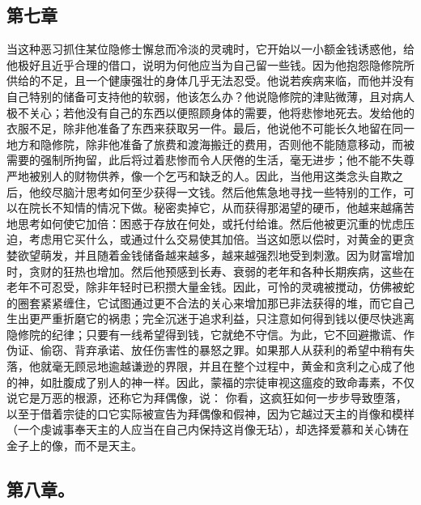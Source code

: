 \subsection{第七章}

\par

当这种恶习抓住某位隐修士懈怠而冷淡的灵魂时，它开始以一小额金钱诱惑他，给他极好且近乎合理的借口，说明为何他应当为自己留一些钱。因为他抱怨隐修院所供给的不足，且一个健康强壮的身体几乎无法忍受。他说若疾病来临，而他并没有自己特别的储备可支持他的软弱，他该怎么办？他说隐修院的津贴微薄，且对病人极不关心；若他没有自己的东西以便照顾身体的需要，他将悲惨地死去。发给他的衣服不足，除非他准备了东西来获取另一件。最后，他说他不可能长久地留在同一地方和隐修院，除非他准备了旅费和渡海搬迁的费用，否则他不能随意移动，而被需要的强制所拘留，此后将过着悲惨而令人厌倦的生活，毫无进步；他不能不失尊严地被别人的财物供养，像一个乞丐和缺乏的人。因此，当他用这类念头自欺之后，他绞尽脑汁思考如何至少获得一文钱。然后他焦急地寻找一些特别的工作，可以在院长不知情的情况下做。秘密卖掉它，从而获得那渴望的硬币，他越来越痛苦地思考如何使它加倍：困惑于存放在何处，或托付给谁。然后他被更沉重的忧虑压迫，考虑用它买什么，或通过什么交易使其加倍。当这如愿以偿时，对黄金的更贪婪欲望萌发，并且随着金钱储备越来越多，越来越强烈地受到刺激。因为财富增加时，贪财的狂热也增加。然后他预感到长寿、衰弱的老年和各种长期疾病，这些在老年不可忍受，除非年轻时已积攒大量金钱。因此，可怜的灵魂被搅动，仿佛被蛇的圈套紧紧缠住，它试图通过更不合法的关心来增加那已非法获得的堆，而它自己生出更严重折磨它的祸患；完全沉迷于追求利益，只注意如何得到钱以便尽快逃离隐修院的纪律；只要有一线希望得到钱，它就绝不守信。为此，它不回避撒谎、作伪证、偷窃、背弃承诺、放任伤害性的暴怒之罪。如果那人从获利的希望中稍有失落，他就毫无顾忌地逾越谦逊的界限，并且在整个过程中，黄金和贪利之心成了他的神，如肚腹成了别人的神一样。因此，蒙福的宗徒审视这瘟疫的致命毒素，不仅说它是万恶的根源，还称它为拜偶像，说： 你看，这疯狂如何一步步导致堕落，以至于借着宗徒的口它实际被宣告为拜偶像和假神，因为它越过天主的肖像和模样（一个虔诚事奉天主的人应当在自己内保持这肖像无玷），却选择爱慕和关心铸在金子上的像，而不是天主。\par


\subsection{第八章。}

